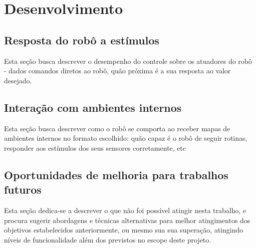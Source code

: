 

\chapter{Desenvolvimento}

\section{Resposta do robô a estímulos}
{\color{red} Esta seção busca descrever o desempenho do controle sobre os atuadores do robô - dados comandos diretos ao
robô, quão próxima é a sua resposta ao valor desejado.}

\section{Interação com ambientes internos}
{\color{red} Esta seção busca descrever como o robô se comporta ao receber mapas de ambientes internos no formato 
escolhido: quão capaz é o robô de seguir rotinas, responder aos estímulos dos seus sensores corretamente, etc}

\section{Oportunidades de melhoria para trabalhos futuros}
{\color{red} Esta seção dedica-se a descrever o que não foi possível atingir nesta trabalho, e procura sugerir
abordagens e técnicas alternativas para melhor atingimentos dos objetivos estabelecidos anteriormente, ou mesmo sua
sua superação, atingindo níveis de funcionalidade além dos previstos no escope deste projeto.}